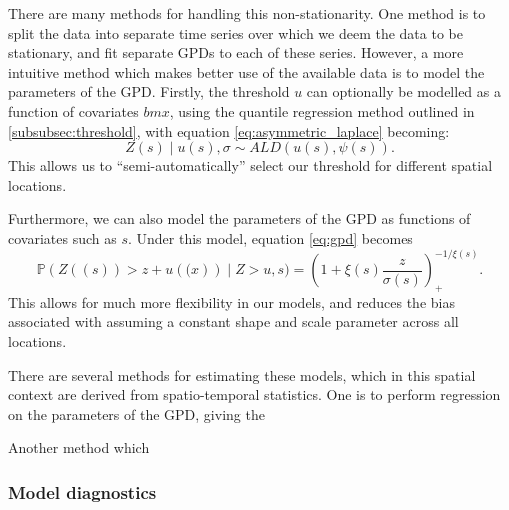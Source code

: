 \documentclass{article}
\numberwithin{equation}{section}
\begin{document}
There are many methods for handling this non-stationarity. 
One method is to split the data into separate time series over which we deem the data to be stationary, and fit separate GPDs to each of these series.
However, a more intuitive method which makes better use of the available data is to model the parameters of the GPD.
Firstly, the threshold $u$ can optionally be modelled as a function of covariates $bm{x}$, using the quantile regression method outlined in \ref{subsubsec:threshold}, with equation \ref{eq:asymmetric_laplace} becoming:
\[
  Z(s) \mid u(s), \sigma \sim ALD(u(s), \psi(s)).
\]
This allows us to ``semi-automatically'' select our threshold for different spatial locations.

Furthermore, we can also model the parameters of the GPD as functions of covariates such as $s$.
Under this model, equation \ref{eq:gpd} becomes
\begin{equation} \label{eq:gpd_cov}
  \mathbb{P}(Z((s)) > z + u(\bm(x)) \mid Z > u, s) = \left(1 + \xi(s) \frac{z}{\sigma(s)} \right)_{+}^{-1/\xi(s)}.
\end{equation}
This allows for much more flexibility in our models, and reduces the bias associated with assuming a constant shape and scale parameter across all locations.

There are several methods for estimating these models, which in this spatial context are derived from spatio-temporal statistics. 
One is to perform regression on the parameters of the GPD, giving the 

Another method which 

\subsubsection{Model diagnostics}

\end{document}
